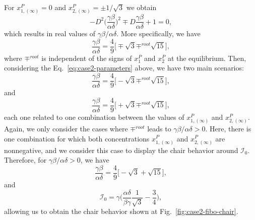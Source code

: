 For $x_{1,(\infty)}^P = 0$ and $x_{2,(\infty)}^P = \pm 1/\sqrt{3}$ we obtain 
\begin{equation}
    -D^2\bigg(\frac{\gamma\beta}{\alpha\delta}\bigg)^2 \mp D\frac{\gamma\beta}{\alpha\delta} + 1 = 0,
\end{equation}
which results in real values of $\gamma\beta/\alpha\delta$. More specifically, we have 
\begin{equation} \label{eq:case2-parameters}
    \frac{\gamma\beta}{\alpha\delta} = \frac{4}{9}\bigg[ \mp \sqrt{3} \mp^{root} \sqrt{15} \bigg],
\end{equation}
where $\mp^{root}$ is independent of the signs of $x_1^P$ and $x_2^P$ at the equilibrium. Then,
considering the Eq.~\ref{eq:case2-parameters} above, we have two main scenarios:
\begin{equation}
    \frac{\gamma\beta}{\alpha\delta} = \frac{4}{9}\bigg[ - \sqrt{3} \mp^{root} \sqrt{15} \bigg],
\end{equation} 
and 
\begin{equation}
    \frac{\gamma\beta}{\alpha\delta} = \frac{4}{9}\bigg[ + \sqrt{3} \mp^{root} \sqrt{15} \bigg],
\end{equation}
each one related to one combination between the values of $x_{1,(\infty)}^P$ and $x_{2,(\infty)}^P$.
Again, we only consider the cases where $\mp^{root}$ leads to $\gamma\beta/\alpha\delta > 0$. Here, 
there is one combination for which both concentrations $x_{1,(\infty)}^P$ and $x_{2,(\infty)}^P$ are 
nonnegative, and we consider this case to display the chair behavior around $\mathcal{I}_0$. Therefore, 
for $\gamma\beta/\alpha\delta > 0$, we have 
\begin{equation}
    \frac{\gamma\beta}{\alpha\delta} = \frac{4}{9}\bigg[ - \sqrt{3} + \sqrt{15} \bigg],
\end{equation}
and 
\begin{equation}
    \mathcal{I}_0 = \gamma \bigg(\frac{\alpha\delta}{\beta\gamma}\frac{1}{\sqrt{3}} - \frac{3}{4}\bigg),
\end{equation}
allowing us to obtain the chair behavior shown at Fig.~\ref{fig:case2-fibo-chair}.

